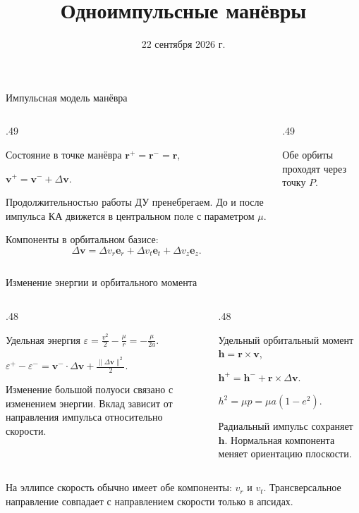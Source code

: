 \documentclass[11pt,aspectratio=169,t]{beamer}
\title{Одноимпульсные манёвры}
\date{22 сентября 2026 г.}
\begin{document}
\begin{frame}[plain]
\titlepage
\end{frame}

\begin{frame}{Импульсная модель манёвра}
\begin{columns}[T,onlytextwidth]
\begin{column}{.49\textwidth}
\begin{block}{Состояние в точке манёвра}
\centering
$\mathbf r^+=\mathbf r^-=\mathbf r$,\par\smallskip
$\mathbf v^+=\mathbf v^-+\Delta\mathbf v$.
\end{block}
\justifying
Продолжительностью работы ДУ пренебрегаем. До и после импульса КА движется в центральном поле с параметром $\mu$.
\par\smallskip
Компоненты в орбитальном базисе:
\[
\Delta\mathbf v=\Delta v_r\mathbf e_r+
\Delta v_t\mathbf e_t+\Delta v_z\mathbf e_z.
\]
\end{column}
\begin{column}{.49\textwidth}
\centering\par
{\color{coursemuted}
Обе орбиты проходят через точку $P$.\par}
\end{column}
\end{columns}
\end{frame}

\begin{frame}{Изменение энергии и орбитального момента}
\begin{columns}[T,onlytextwidth]
\begin{column}{.48\textwidth}
\begin{block}{Удельная энергия}
\centering
$\displaystyle\varepsilon=\frac{v^2}{2}-\frac\mu r=-\frac\mu{2a}.$
\par\medskip
$\displaystyle\varepsilon^+-\varepsilon^-
=\mathbf v^-\!\cdot\Delta\mathbf v+
\frac{\|\Delta\mathbf v\|^2}{2}.$
\end{block}
\justifying
Изменение большой полуоси связано с изменением энергии. Вклад зависит от направления импульса относительно скорости.
\end{column}
\begin{column}{.48\textwidth}
\begin{block}{Удельный орбитальный момент}
\centering
$\mathbf h=\mathbf r\times\mathbf v$,\par\smallskip
$\mathbf h^+=\mathbf h^-+\mathbf r\times\Delta\mathbf v$.
\par\smallskip
$h^2=\mu p=\mu a(1-e^2)$.
\end{block}
\justifying
Радиальный импульс сохраняет $\mathbf h$. Нормальная компонента меняет ориентацию плоскости.
\end{column}
\end{columns}
\medskip
\justifying
На эллипсе скорость обычно имеет обе компоненты: $v_r$ и $v_t$.
Трансверсальное направление совпадает с направлением скорости только в апсидах.
\end{frame}
\end{document}
